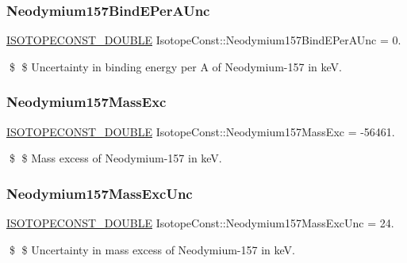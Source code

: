 \subsubsection{\texorpdfstring{Neodymium157\+Bind\+E\+Per\+A\+Unc}{Neodymium157BindEPerAUnc}}
{\footnotesize\ttfamily \mbox{\hyperlink{group___isotope_const-_macros_ga8f45a7272ce02c0b4c65c44636ed719a}{I\+S\+O\+T\+O\+P\+E\+C\+O\+N\+S\+T\+\_\+\+D\+O\+U\+B\+LE}} Isotope\+Const\+::\+Neodymium157\+Bind\+E\+Per\+A\+Unc = 0.}

\$ \$ Uncertainty in binding energy per A of Neodymium-\/157 in keV. \mbox{\label{group___isotope_const-_neodymium-_nd157_ga9b858d930b772143a6ff89730420daa1}} 
\subsubsection{\texorpdfstring{Neodymium157\+Mass\+Exc}{Neodymium157MassExc}}
{\footnotesize\ttfamily \mbox{\hyperlink{group___isotope_const-_macros_ga8f45a7272ce02c0b4c65c44636ed719a}{I\+S\+O\+T\+O\+P\+E\+C\+O\+N\+S\+T\+\_\+\+D\+O\+U\+B\+LE}} Isotope\+Const\+::\+Neodymium157\+Mass\+Exc = -\/56461.}

\$ \$ Mass excess of Neodymium-\/157 in keV. \mbox{\label{group___isotope_const-_neodymium-_nd157_ga92ba1661e6d8797e58d91b82ef360311}} 
\subsubsection{\texorpdfstring{Neodymium157\+Mass\+Exc\+Unc}{Neodymium157MassExcUnc}}
{\footnotesize\ttfamily \mbox{\hyperlink{group___isotope_const-_macros_ga8f45a7272ce02c0b4c65c44636ed719a}{I\+S\+O\+T\+O\+P\+E\+C\+O\+N\+S\+T\+\_\+\+D\+O\+U\+B\+LE}} Isotope\+Const\+::\+Neodymium157\+Mass\+Exc\+Unc = 24.}

\$ \$ Uncertainty in mass excess of Neodymium-\/157 in keV. \mbox{\label{group___isotope_const-_neodymium-_nd157_ga1dc4254db171c75556f56e673829192b}} 
